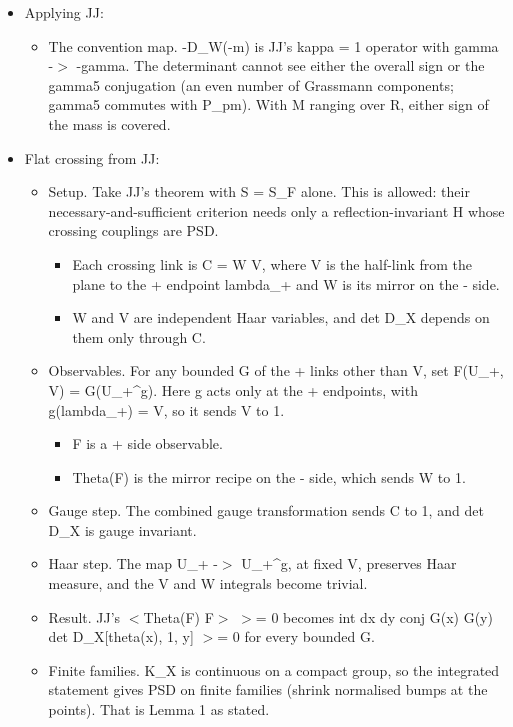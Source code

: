 \documentclass[11pt,a4paper]{article}
\begin{document}
\begin{itemize}
\item{} Applying JJ:
\begin{itemize}
\item{} The convention map. -D\_W(-m) is JJ's kappa = 1 operator with gamma -$>$ -gamma. The determinant cannot see either
the overall sign or the gamma5 conjugation (an even number of Grassmann components; gamma5 commutes with
P\_pm). With M ranging over R, either sign of the mass is covered.
\end{itemize}

\item{} Flat crossing from JJ:
\begin{itemize}
\item{} Setup. Take JJ's theorem with S = S\_F alone. This is allowed: their necessary-and-sufficient criterion needs only a reflection-invariant
H whose crossing couplings are PSD.
\begin{itemize}
\item{} Each crossing link is C = W V, where V is the half-link from the plane to the + endpoint lambda\_+ and W is its
mirror on the - side.
\item{} W and V are independent Haar variables, and det D\_X depends on them only through C.
\end{itemize}

\item{} Observables. For any bounded G of the + links other than V, set F(U\_+, V) = G(U\_+\textasciicircum{}g). Here g acts only at the +
endpoints, with g(lambda\_+) = V, so it sends V to 1.
\begin{itemize}
\item{} F is a + side observable.
\item{} Theta(F) is the mirror recipe on the - side, which sends W to 1.
\end{itemize}

\item{} Gauge step. The combined gauge transformation sends C to 1, and det D\_X is gauge invariant.
\item{} Haar step. The map U\_+ -$>$ U\_+\textasciicircum{}g, at fixed V, preserves Haar measure, and the V and W integrals become trivial.
\item{} Result. JJ's $<$Theta(F) F$>$ $>$= 0 becomes
int dx dy conj G(x) G(y) det D\_X[theta(x), 1, y] $>$= 0 for every bounded G.
\item{} Finite families. K\_X is continuous on a compact group, so the integrated statement gives PSD on finite families
(shrink normalised bumps at the points). That is Lemma 1 as stated.
\end{itemize}


\end{itemize}
\end{document}
